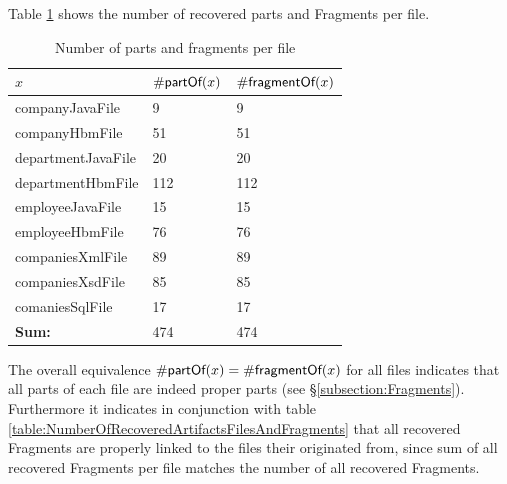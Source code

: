 Table \ref{table:NumberOfPartsAndFragmentsPerFile} shows the number of recovered parts and \glspl{Fragment} per file. 
\begin{table}[h!]
\begin{center}
\begin{tabular}{|l|l|l|}
\hline
$x$ & $\#\textsf{partOf}(x)$ & $\#\textsf{fragmentOf}(x)$
\\ \hline
companyJavaFile & 9 & 9 
\\ \hline
companyHbmFile & 51 & 51 
\\ \hline
departmentJavaFile & 20 & 20 
\\ \hline
departmentHbmFile & 112 & 112 
\\ \hline
employeeJavaFile & 15 & 15 
\\ \hline
employeeHbmFile & 76 & 76 
\\ \hline
companiesXmlFile & 89 & 89 
\\ \hline
companiesXsdFile & 85 & 85 
\\ \hline
comaniesSqlFile & 17 & 17 
\\ \hline \hline
\textbf{Sum:} & 474 & 474 
\\ \hline 
\end{tabular}
\end{center}
\caption{Number of parts and fragments per file}
\label{table:NumberOfPartsAndFragmentsPerFile}
\end{table}
The overall equivalence $\#\textsf{partOf}(x) = \#\textsf{fragmentOf}(x)$ for all files indicates that all parts of each file are indeed proper parts (see §\ref{subsection:Fragments}).
Furthermore it indicates in conjunction with table \ref{table:NumberOfRecoveredArtifactsFilesAndFragments} that all recovered \glspl{Fragment} are properly linked to the files their originated from, since sum of all recovered \glspl{Fragment} per file matches the number of all recovered \glspl{Fragment}.

